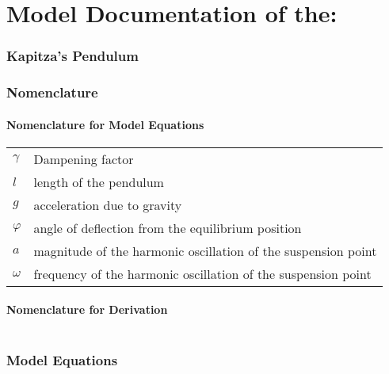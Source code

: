 \documentclass[10pt,a4paper]{article}
\begin{document}
	\part*{Model Documentation of the:}
	\section*{Kapitza's Pendulum} %
	
	
	\section{Nomenclature} %
	\subsection{Nomenclature for Model Equations} %
	
	\begin{tabular}{ll}
		$\gamma$ & Dampening factor \\
		$l$ & length of the pendulum \\
		$g$ & acceleration due to gravity \\
		$\varphi$ & angle of deflection from the equilibrium position \\
		$a$ & magnitude of the harmonic oscillation of the suspension point \\
		$\omega$ & frequency of the harmonic oscillation of the suspension point
				
	\end{tabular}
	
	\subsection{Nomenclature for Derivation} %
	
	\begin{tabular}{ll}

	\end{tabular}
	
	
	\section{Model Equations} %
	
\end{document}
